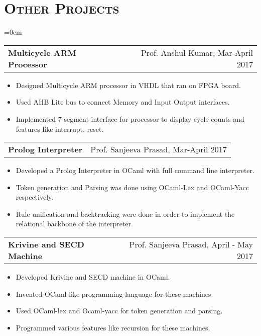 \documentclass{article}
\makeatletter
\newenvironment{longversion}{}{} %
\newcommand{\headerrow}[2]
{\begin{tabular*}{\linewidth}{l@{\extracolsep{\fill}}r}
	#1 &
	#2 \\
\end{tabular*}}
\newcommand{\tmpsection}[1]{}
\let\tmpsection=\section
\renewcommand{\section}[1]{\tmpsection*{\textsc{#1}}}
\makeatother
\begin{document}
\begin{longversion}
\section{Other Projects}
\begin{list} {}{\leftmargin=0em}
\setlength{\leftmargin}{0pt}

\item[]
\headerrow {\textbf{Multicycle ARM Processor}}{Prof. Anshul Kumar, Mar-April 2017}
\begin{itemize}
\setlength\itemsep{0.0em}
    \item Designed Multicycle ARM processor in VHDL that ran on FPGA board.
    \item Used AHB Lite bus to connect Memory and Input Output interfaces.
    \item Implemented 7 segment interface for processor to display cycle counts and features like interrupt, reset.
\end{itemize}

\item[]
\headerrow {\textbf{Prolog Interpreter}}{Prof. Sanjeeva Prasad, Mar-April 2017}
\begin{itemize}
\setlength\itemsep{0.0em}
    \item Developed a Prolog Interpreter in OCaml with full command line interpreter.
    \item Token generation and Parsing was done using OCaml-Lex and OCaml-Yacc respectively.
    \item Rule unification and backtracking were done in order to implement the relational backbone of the interpreter.
\end{itemize}

\item[]
\headerrow{ \textbf{Krivine and SECD Machine}} {Prof. Sanjeeva Prasad, April - May 2017}
\begin{itemize}
\setlength\itemsep{0.0em}
\item Developed Krivine and SECD machine in OCaml.
\item Invented OCaml like programming language for these machines.
\item Used OCaml-lex and Ocaml-yacc for token generation and parsing.
\item Programmed various features like recursion for these machines.
\end{itemize}



\end{list}
\end{longversion}
\end{document}
